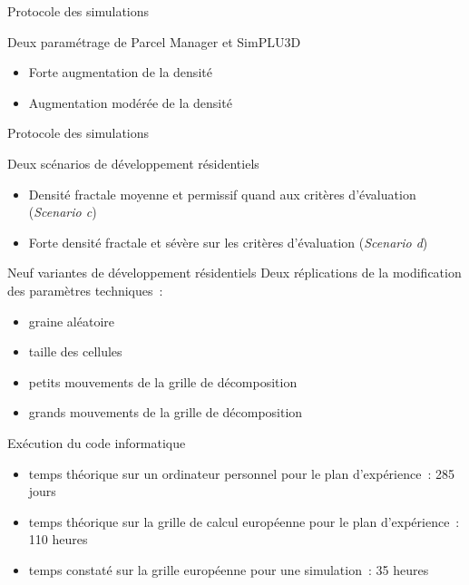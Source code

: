 \documentclass[xcolor=table]{beamer}
\begin{document}
\begin{frame}{Protocole des simulations}
\begin{block}{Deux paramétrage de Parcel Manager et SimPLU3D}
	\begin{itemize}
		\item Forte augmentation de la densité
		\item Augmentation modérée de la densité
	\end{itemize}
\end{block}
\end{frame}

\begin{frame}{Protocole des simulations}
\begin{block}{Deux scénarios de développement résidentiels}
	\begin{itemize}
		\item Densité fractale moyenne et permissif quand aux critères d'évaluation (\textit{Scenario c})
		\item Forte densité fractale et sévère sur les critères d'évaluation (\textit{Scenario d})
	\end{itemize}
\end{block}
\begin{block}{Neuf variantes de développement résidentiels}
\vspace{0.1cm}
	Deux réplications de la modification des paramètres techniques~:
	\begin{itemize}
		\item graine aléatoire
		\item taille des cellules
		\item petits mouvements de la grille de décomposition
		\item grands mouvements de la grille de décomposition
	\end{itemize}
\end{block}
\end{frame}

\begin{frame}{Exécution du code informatique}
	\begin{itemize}
		\item temps théorique sur un ordinateur personnel pour le plan d'expérience~: 285 jours
		\item temps théorique sur la grille de calcul européenne pour le plan d'expérience~: 110 heures
		\item temps constaté sur la grille européenne pour une simulation~: 35 heures
	\end{itemize}
\end{frame}
\end{document}
